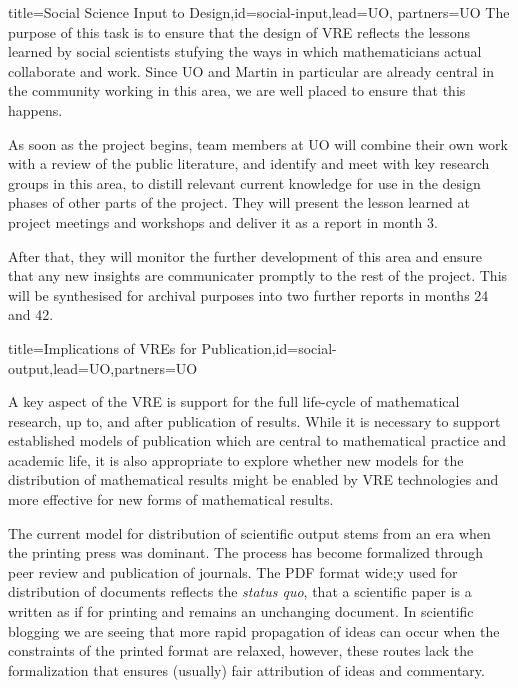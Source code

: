 \begin{workpackage}[id=social-aspects,wphases=0-48,
  title=Social Aspects,
  lead=UO,
  UORM=27,USHRM=8, USORM=6]
\begin{wpdescription}
\end{wpdescription}

\begin{tasklist}
\begin{task}{title=Social Science Input to
    Design,id=social-input,lead=UO,
    partners={UO}}
The purpose of this task is to ensure that the design of \TheProject
VRE reflects the lessons learned by social scientists stufying the
ways in which mathematicians actual collaborate and work. Since UO and
Martin in particular are already central in the community
working in this area, we are well placed to ensure that this happens. 

As soon as the project begins, team members at UO will combine their
own work with a review of the public literature, and identify and
meet with key research groups in this area, to distill relevant
current knowledge for use in the design phases of other parts of the
project. They will  present the lesson
learned at project meetings and workshops and deliver it as a report
in month 3.

After that, they will monitor the further development of this area and
ensure that any new insights are communicater promptly to the rest of
the project. This will be synthesised for archival purposes into two
further reports in months 24 and 42. 

\end{task}

\begin{task}{title=Implications of VREs for Publication,id=social-output,lead=UO,partners={UO}}

A key aspect of the \TheProject VRE is support for the full life-cycle
of mathematical research, up to, and after publication of
results. While it is necessary to support established models of
publication which are central to mathematical practice and academic
life, it is also appropriate to explore whether new models for the
distribution of mathematical results might be enabled by VRE
technologies and more effective for new forms of mathematical results.

The current model for distribution of scientific output stems from an
era when the printing press was dominant. The process has become
formalized through peer review and publication of journals. The PDF
format wide;y used for distribution of documents reflects the
\textit{status quo}, that a
scientific paper is a written as if for printing and remains an
unchanging document. In scientific blogging we are seeing that more
rapid propagation of ideas can occur when the constraints of the
printed format are relaxed, however, these routes lack the formalization
that ensures (usually) fair attribution of ideas and commentary. 


\end{task}
\end{tasklist}
\end{workpackage}
